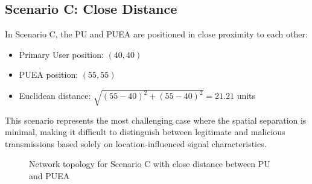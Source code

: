 \subsection{Scenario C: Close Distance}

In Scenario C, the PU and PUEA are positioned in close proximity to each other:
\begin{itemize}
    \item Primary User position: $(40, 40)$
    \item PUEA position: $(55, 55)$
    \item Euclidean distance: $\sqrt{(55-40)^2 + (55-40)^2} = 21.21$ units
\end{itemize}

This scenario represents the most challenging case where the spatial separation is minimal, making it difficult to distinguish between legitimate and malicious transmissions based solely on location-influenced signal characteristics.

\begin{figure}[htbp]
    \centering
    \caption{Network topology for Scenario C with close distance between PU and PUEA}
    \label{fig:scenario_c}
\end{figure}

